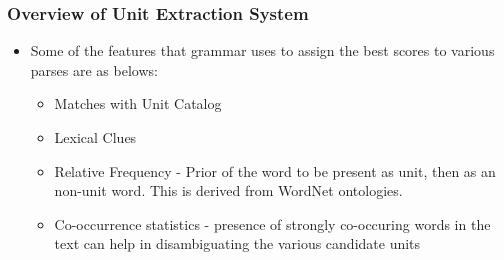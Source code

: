 \documentclass{beamer}
\begin{document}
\begin{frame}
 \frametitle{Overview of Unit Extraction System}
 \begin{itemize}
  \item Some of the features that grammar uses to assign the best scores to various
parses are as belows: \pause
    \begin{itemize}
        \item Matches with Unit Catalog \pause
	\item Lexical Clues \pause
	\item Relative Frequency - Prior of the word to be present as unit, then as an
	  non-unit word. This is derived from WordNet ontologies. \pause
	\item Co-occurrence statistics - presence of strongly co-occuring words in the
	  text can help in disambiguating the various candidate units 
    \end{itemize}
 \end{itemize}

 
 
\end{frame}
\end{document}
